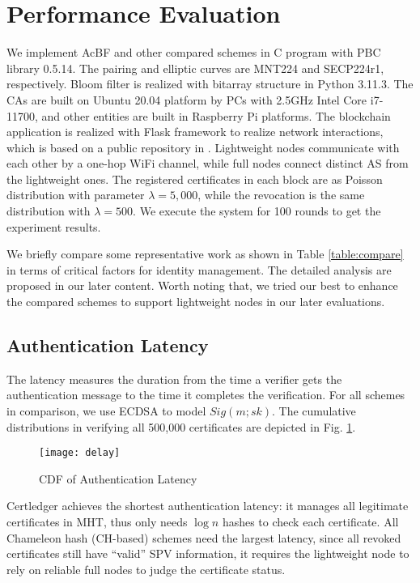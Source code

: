 \documentclass[conference]{IEEEtran}
\begin{document}
\section{Performance Evaluation} \label{sec:efficiency}
We implement AcBF and other compared schemes in C program with PBC library 0.5.14. The pairing and elliptic curves are MNT224 and SECP224r1, respectively. Bloom filter is realized with bitarray structure in Python 3.11.3. The CAs are built on Ubuntu 20.04 platform by PCs with 2.5GHz Intel Core i7-11700, and other entities are built in Raspberry Pi platforms. The blockchain application is realized with Flask framework to realize network interactions, which is based on a public repository in \cite{implement}. 
Lightweight nodes communicate with each other by a one-hop WiFi channel, while full nodes connect distinct AS from the lightweight ones. The registered certificates in each block are as Poisson distribution with parameter $\lambda = 5, 000$, while the revocation is the same distribution with $\lambda = 500$. We execute the system for 100 rounds to get the experiment results.

We briefly compare some representative work as shown in Table \ref{table:compare} in terms of critical factors for identity management. The detailed analysis are proposed in our later content. %
Worth noting that, we tried our best to enhance the compared schemes to support lightweight nodes in our later evaluations. 

\subsection{Authentication Latency}\label{sec:authentication latency}

The latency measures the duration from the time a verifier gets the authentication message to the time it completes the verification. For all schemes in comparison, we use ECDSA to model $Sig(m; sk)$. The cumulative distributions in verifying all 500,000 certificates are depicted in Fig. \ref{fig:cdf}. 

\begin{figure}[t]
	\centering
	\texttt{[image: delay]}
	\caption{CDF of Authentication Latency}
	\label{fig:cdf}
\end{figure}

Certledger \cite{certledger} achieves the shortest authentication latency: it manages all legitimate certificates in MHT, thus only needs $\log n$ hashes to check each certificate. All Chameleon hash (CH-based) schemes \cite{luoScalaCertScalabilityOrientedPKI2022a,jia2021process} need the largest latency, since all revoked certificates still have ``valid'' SPV information, it requires the lightweight node to rely on reliable full nodes to judge the certificate status. 
\end{document}
